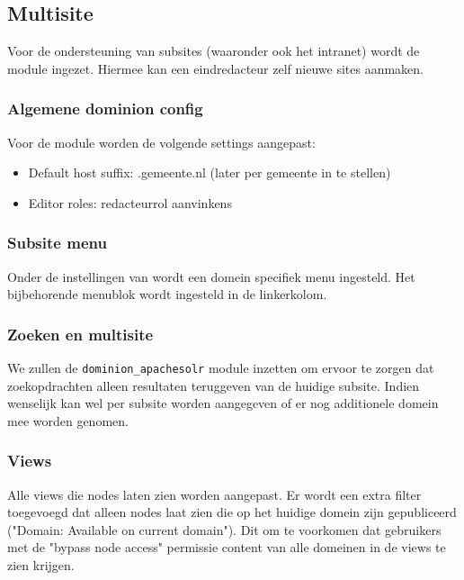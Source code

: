 \subsection{Multisite}\label{multisite}

Voor de ondersteuning van subsites (waaronder ook het intranet) wordt de  module ingezet. Hiermee kan een eindredacteur zelf nieuwe sites aanmaken.

\subsubsection{Algemene dominion config}
Voor de  module worden de volgende settings aangepast:
\begin{itemize}
\item Default host suffix: .gemeente.nl (later per gemeente in te stellen)
\item Editor roles: redacteurrol aanvinkens
\end{itemize}

\subsubsection{Subsite menu}
Onder de instellingen van  wordt een domein specifiek menu ingesteld. Het bijbehorende menublok wordt ingesteld in de linkerkolom.

\subsubsection{Zoeken en multisite}
We zullen de \texttt{dominion\_apachesolr} module inzetten om ervoor te zorgen dat zoekopdrachten alleen resultaten teruggeven van de huidige subsite. Indien wenselijk kan wel per subsite worden aangegeven of er nog additionele domein mee worden genomen.

\subsubsection{Views}
Alle views die nodes laten zien worden aangepast. Er wordt een extra filter toegevoegd dat alleen nodes laat zien die op het huidige domein zijn gepubliceerd ("Domain: Available on current domain"). Dit om te voorkomen dat gebruikers met de "bypass node access" permissie content van alle domeinen in de views te zien krijgen.

